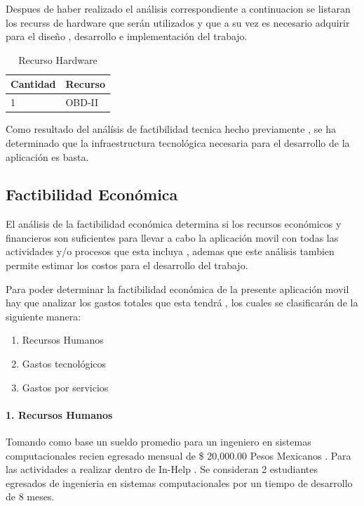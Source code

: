 Despues de haber realizado el análisis correspondiente a continuacion se listaran los recurss de hardware que serán utilizados y que a su vez es necesario adquirir para el diseño , desarrollo e implementación del trabajo.\\

\begin{table}[htbp]
		\begin{tabular}{|p{5cm}|p{7cm}|}
	\hline
		Cantidad & Recurso \\
	\hline

	\hline
		1&OBD-II \\
	\hline
				\end{tabular}
				\caption{Recurso Hardware}
				\label{disenoEstructura:rechardware}
				\end{table}
Como resultado del análísis de factibilidad tecnica hecho previamente , se ha determinado que la infraestructura tecnológica necesaria para el desarrollo de la aplicación es basta.

\subsection{Factibilidad Económica}

El análisis de la factibilidad económica determina si los recursos económicos y financieros son suficientes para llevar a cabo la aplicación movil con todas las actividades y/o procesos que esta incluya , ademas que este análisis tambien permite estimar los costos para el desarrollo del trabajo.

Para poder determinar la factibilidad económica de la presente aplicación movil hay que analizar los gastos totales que esta tendrá , los cuales se clasificarán de la siguiente manera:

\begin{enumerate}
	\item Recursos Humanos
	\item Gastos tecnológicos
	\item Gastos por servicios
\end{enumerate}

\paragraph{1. Recursos Humanos}

Tomando como base un sueldo promedio para un ingeniero en sistemas computacionales recien egresado mensual de \$ 20,000.00 Pesos Mexicanos . Para las actividades a realizar dentro de In-Help . Se consideran 2 estudiantes egresados de ingenieria en sistemas computacionales por un tiempo de desarrollo de 8 meses.

